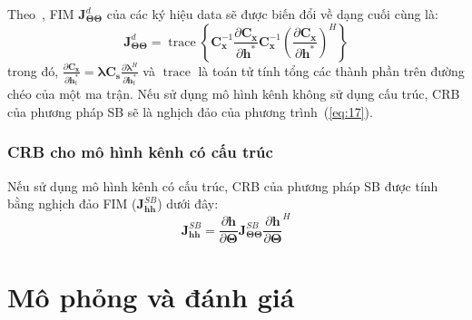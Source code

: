 Theo~\cite{Kay1993}, FIM $\mathbf{J}_{\boldsymbol{\Theta} \boldsymbol{\Theta}}^{d}$ của các ký hiệu data sẽ được biến đổi về dạng cuối cùng là:
\begin{equation}
    \mathbf{J}_{\boldsymbol{\Theta} \boldsymbol{\Theta}}^{d}=\operatorname{trace}\left\{\mathbf{C}_{\mathbf{x}}^{-1} \frac{\partial \mathbf{C}_{\mathbf{x}}}{\partial \mathbf{h}^{*}} \mathbf{C}_{\mathbf{x}}^{-1}\left(\frac{\partial \mathbf{C}_{\mathbf{x}}}{\partial \mathbf{h}^{*}}\right)^{H}\right\}
\end{equation}
trong đó, $\frac{\partial \mathbf{C}_{\mathbf{x}}}{\partial \mathbf{h}_{t}^{*}}=\boldsymbol{\lambda} \mathbf{C}_{\mathbf{s}} \frac{\partial \boldsymbol{\lambda}^{H}}{\partial \mathbf{h}_{t}^{*}}$ và $\operatorname{trace}$ là toán tử tính tổng các thành phần trên đường chéo của một ma trận. Nếu sử dụng mô hình kênh không sử dụng cấu trúc, CRB của phương pháp SB sẽ là nghịch đảo của phương trình~(\ref{eq:17}). 

\subsubsection*{\textbf{CRB cho mô hình kênh có cấu trúc}}

Nếu sử dụng mô hình kênh có cấu trúc, CRB của phương pháp SB được tính bằng nghịch đảo FIM ($\mathbf{J}^{SB}_{\mathbf{h} \mathbf{h}}$) dưới đây:
\begin{equation}
\label{eq:SB_MRE}
    \mathbf{J}^{SB}_{\mathbf{h} \mathbf{h}}=\frac{\partial \mathbf{h}}{\partial \boldsymbol{\Theta}} \mathbf{J}^{SB}_{\boldsymbol{\Theta} \boldsymbol{\Theta}} {\frac{\partial \mathbf{h}}{\partial \boldsymbol{\Theta}}}^{H}
\end{equation}

\section{Mô phỏng và đánh giá}\label{SR}

